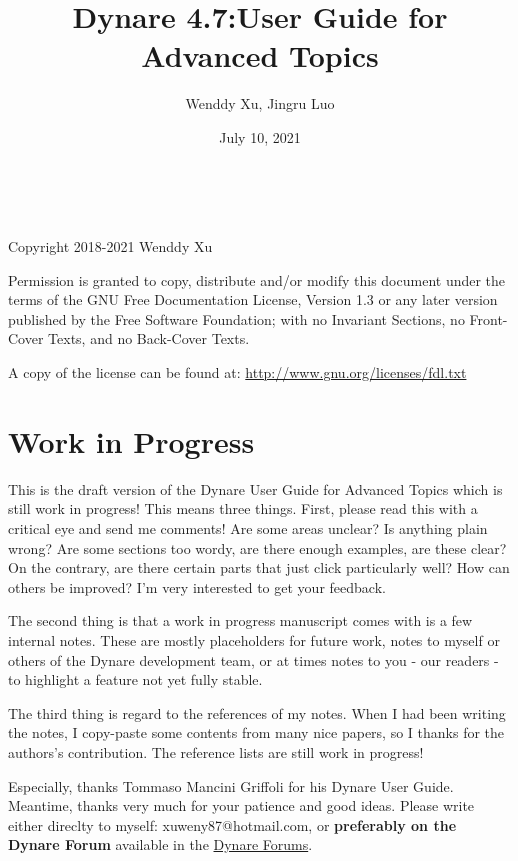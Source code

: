 \documentclass[10pt,math=newtx,citestyle=gb7714-2015,bibstyle=gb7714-2015]{elegantbook}
\title{Dynare 4.7:User Guide for Advanced Topics}
\author{Wenddy Xu, Jingru Luo}
\institute{AHU/CIMERS/NEEL, China; SFU, Canada}
\date{July 10, 2021}
\begin{document}
	
	\maketitle
	\frontmatter
	
	\thispagestyle{empty}
	
	\newpage
	
	~\vfill
	
	Copyright  2018-2021 Wenddy Xu
	
	
	\bigskip
	
	Permission is granted to copy, distribute and/or modify this document under the terms of the GNU Free Documentation License, Version 1.3 or any later version published by the Free Software Foundation; with no Invariant Sections, no Front-Cover Texts, and no Back-Cover Texts.
	
	\bigskip
	
	A copy of the license can be found at: \url{http://www.gnu.org/licenses/fdl.txt}
	
	\vfill
	
	\newpage
	
	\chapter*{Work in Progress}
	
	
	
	This is the draft version of the Dynare User Guide for Advanced Topics which is still work in progress! This means three things. First, please read this with a critical eye and send me comments! Are some areas unclear? Is anything plain wrong? Are some sections too wordy, are there enough examples, are these clear? On the contrary, are there certain parts that just click particularly well? How can others be improved? I'm very interested to get your feedback. 
	
	The second thing is that a work in progress manuscript comes with is a few internal notes. These are mostly placeholders for future work, notes to myself or others of the Dynare development team, or at times notes to you - our readers - to highlight a feature not yet fully stable. 
	
	The third thing is regard to the references of my notes. When I had been writing the notes, I copy-paste some contents from many nice papers, so I thanks for the authors's contribution. The reference lists are still work in progress!
	
	Especially, thanks Tommaso Mancini Griffoli for his Dynare User Guide. Meantime, thanks very much for your patience and good ideas. Please write either direclty to myself: xuweny87@hotmail.com, or \textbf{preferably on the Dynare Forum} available in the \href{http://forum.dynare.org}{Dynare Forums}.
	
\end{document}
